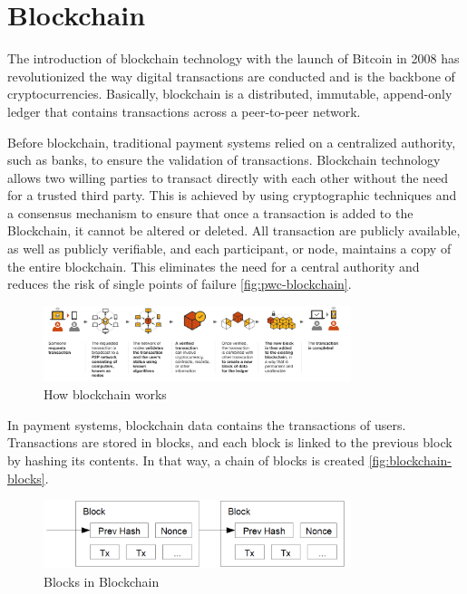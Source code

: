 \section{Blockchain}

The introduction of blockchain technology with the launch of Bitcoin \cite{nakamoto2009bitcoin} in 2008 has revolutionized the way digital transactions are conducted and is the backbone of cryptocurrencies. Basically, blockchain is a distributed, immutable, append-only ledger that contains transactions across a peer-to-peer network.

Before blockchain, traditional payment systems relied on a centralized authority, such as banks, to ensure the validation of transactions. 
Blockchain technology allows two willing parties to transact directly with each other without the need for a trusted third party. 
This is achieved by using cryptographic techniques and a consensus mechanism to ensure that once a transaction is added to the Blockchain, it cannot be altered or deleted. 
All transaction are publicly available, as well as publicly verifiable, and each participant, or node, maintains a copy of the entire blockchain. This eliminates the need for a central authority and reduces the risk of single points of failure \autoref{fig:pwc-blockchain}. 

\begin{figure}
    \centering
    \includegraphics[width=0.8\textwidth]{images/blockcahin_how.png}
    \caption{How blockchain works \cite{pwcBlockchain}}
    \label{fig:pwc-blockchain}
\end{figure}

In payment systems, blockchain data contains the transactions of users. Transactions are stored in blocks, and each block is linked to the previous block by hashing its contents. In that way, a chain of blocks is created \autoref{fig:blockchain-blocks}.

\begin{figure}
    \centering
    \includegraphics[width=0.8\textwidth]{images/chain_of_blocks.png}
    \caption{Blocks in Blockchain \cite{nakamoto2009bitcoin}}
    \label{fig:blockchain-blocks}
\end{figure}

